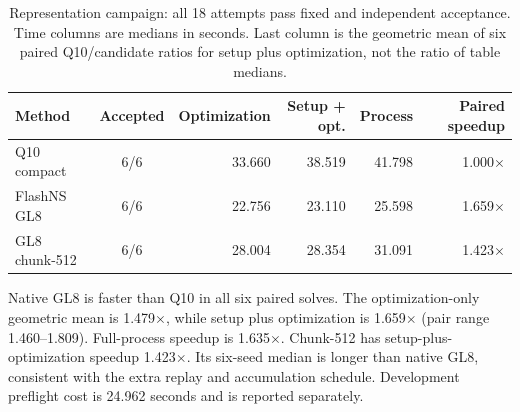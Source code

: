 \documentclass[11pt]{article}
\begin{document}
\begin{table}[t]
\centering\small
\setlength{\tabcolsep}{4pt}
\caption{Representation campaign: all 18 attempts pass fixed and independent acceptance. Time columns are medians in seconds. Last column is the geometric mean of six paired Q10/candidate ratios for setup plus optimization, not the ratio of table medians.}
\label{tab:internal}
\begin{tabular}{lcrrrr}\toprule
Method & Accepted & Optimization & Setup + opt. & Process & Paired speedup\\\midrule
Q10 compact & 6/6 & 33.660 & 38.519 & 41.798 & 1.000$\times$\\
FlashNS GL8 & 6/6 & 22.756 & 23.110 & 25.598 & 1.659$\times$\\
GL8 chunk-512 & 6/6 & 28.004 & 28.354 & 31.091 & 1.423$\times$\\
\bottomrule\end{tabular}
\end{table}

Native GL8 is faster than Q10 in all six paired solves. The optimization-only geometric mean is 1.479$\times$, while setup plus optimization is 1.659$\times$ (pair range 1.460--1.809). Full-process speedup is 1.635$\times$. Chunk-512 has setup-plus-optimization speedup 1.423$\times$. Its six-seed median is longer than native GL8, consistent with the extra replay and accumulation schedule. Development preflight cost is 24.962 seconds and is reported separately.
\end{document}

